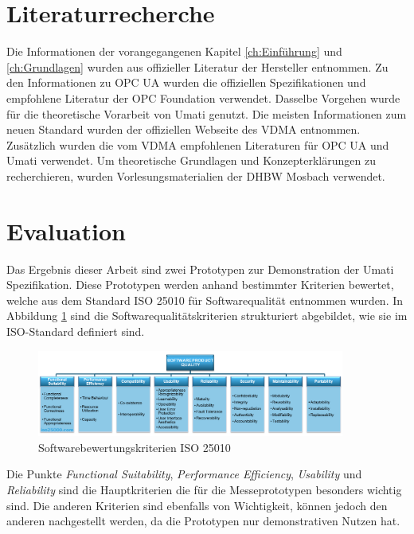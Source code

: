 \documentclass[a4paper, 12pt, oneside, toc=listofnumbered, bibliography=totoc]{scrbook}
\begin{document}
	\section{Literaturrecherche}
	
	Die Informationen der vorangegangenen Kapitel \ref{ch:Einführung} und \ref{ch:Grundlagen} wurden aus offizieller Literatur der Hersteller entnommen. Zu den Informationen zu OPC UA wurden die offiziellen Spezifikationen und empfohlene Literatur der OPC Foundation verwendet. Dasselbe Vorgehen wurde für die theoretische Vorarbeit von \ac{Umati} genutzt. Die meisten Informationen zum neuen Standard wurden der offiziellen Webseite des VDMA entnommen. Zusätzlich wurden die vom VDMA empfohlenen Literaturen für OPC UA und Umati verwendet. Um theoretische Grundlagen und Konzepterklärungen zu recherchieren, wurden Vorlesungsmaterialien der DHBW Mosbach verwendet.
	
	
	
	\section{Evaluation}
	
	
	Das Ergebnis dieser Arbeit sind zwei Prototypen zur Demonstration der \ac{Umati} Spezifikation. Diese Prototypen werden anhand bestimmter Kriterien bewertet, welche aus dem Standard ISO 25010 für Softwarequalität entnommen wurden. In Abbildung \ref{fig:ISO25010} sind die Softwarequalitätskriterien strukturiert abgebildet, wie sie im ISO-Standard definiert sind. 
	
	\begin{figure}[H]
		\centering
		\includegraphics[width=0.9\textwidth]{res/diagramms/iso25010.png}
		\caption{Softwarebewertungskriterien ISO 25010} 
		\label{fig:ISO25010}
	\end{figure}
	
	Die Punkte \textit{Functional Suitability}, \textit{Performance Efficiency}, \textit{Usability} und \textit{Reliability} sind die Hauptkriterien die für die Messeprototypen besonders wichtig sind. Die anderen Kriterien sind ebenfalls von Wichtigkeit, können jedoch den anderen nachgestellt werden, da die Prototypen nur demonstrativen Nutzen hat. 
	
\end{document}
